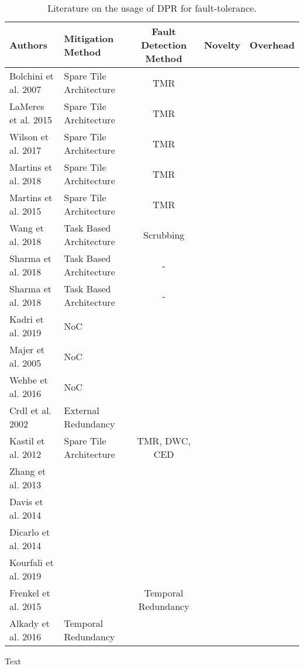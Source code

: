 \begin{table*}
    \caption{Literature on the usage of \gls{DPR} for fault-tolerance.}
    \begin{tabular*}{\textwidth}{@{\extracolsep{\fill}}llccc}
        \toprule
       \textbf{Authors} & \textbf{Mitigation Method} & \textbf{Fault Detection Method} & \textbf{Novelty} & \textbf{Overhead} \\
       \midrule
       \cite{bolchini2007} Bolchini et al. 2007        & Spare Tile Architecture      & TMR & \\
       \cite{lameres_radsat_2015} LaMeres et al. 2015       & Spare Tile Architecture      & TMR & \\
       \cite{wilson_hybrid_2017} Wilson et al. 2017         & Spare Tile Architecture      & TMR & \\
       \cite{martins_dynamic_2018} Martins et al. 2018      & Spare Tile Architecture      & TMR & \\
       \cite{martins_tmr_2015} Martins et al. 2015          & Spare Tile Architecture      & TMR & \\
       \cite{wang_dynamic_2018} Wang et al. 2018            & Task Based Architecture      & Scrubbing & \\
       \cite{sharma_run-time_2018} Sharma et al. 2018       & Task Based Architecture      & - & \\
       \cite{sharma_run-time_2018} Sharma et al. 2018       & Task Based Architecture      & - & \\
       \cite{kadri_survey_2019} Kadri et al. 2019           & NoC                          & &\\
       \cite{majer_packet_2005} Majer et al. 2005           & NoC                          & &\\
       \cite{wehbe_secure_2016} Wehbe et al. 2016           & NoC                          & &\\
       \cite{crdl_fail-safe_2002} Crdl et al. 2002          & External Redundancy           & &\\
       \cite{kastil2012} Kastil et al. 2012                 & Spare Tile Architecture      & TMR, DWC, CED  &\\
       \cite{zhang2013} Zhang et al. 2013                   &            & &\\
       \cite{davis2014} Davis et al. 2014                   &            & &\\
       \cite{dicarlo2014} Dicarlo et al. 2014               &            & &\\
       \cite{kourfali2019} Kourfali et al. 2019             &            & &\\
       \cite{frenkel2015} Frenkel et al. 2015             &            & Temporal Redundancy &\\
       \cite{alkady_integration_2016} Alkady et al. 2016             & Temporal Redundancy             & &\\
       \bottomrule
    \end{tabular*}
    Text
\end{table*}
